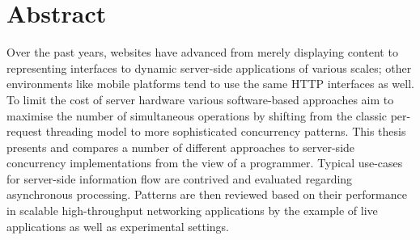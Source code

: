 \chapter{Abstract}

Over the past years, websites have advanced from merely displaying content to representing interfaces to dynamic server-side applications of various scales; other environments like mobile platforms tend to use the same HTTP interfaces as well. To limit the cost of server hardware various software-based approaches aim to maximise the number of simultaneous operations by shifting from the classic per-request threading model to more sophisticated concurrency patterns. This thesis presents and compares a number of different approaches to server-side concurrency implementations from the view of a programmer. Typical use-cases for server-side information flow are contrived and evaluated regarding asynchronous processing. Patterns are then reviewed based on their performance in scalable high-throughput networking applications by the example of live applications as well as experimental settings.